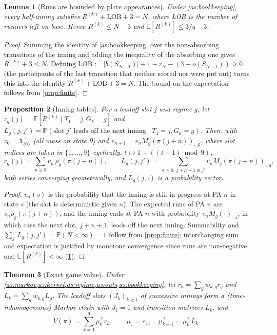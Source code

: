 \documentclass[11pt]{article}
\newtheorem{theorem}{Theorem}
\newtheorem{proposition}[theorem]{Proposition}
\newtheorem{lemma}[theorem]{Lemma}
\theoremstyle{definition}
\theoremstyle{remark}
\newcommand{\E}{\mathbb{E}}
\renewcommand{\P}{\mathbb{P}}
\newcommand{\cS}{\mathcal{S}}
\newcommand{\abs}{\mathsf{a}}
\begin{document}
\begin{lemma}[Runs are bounded by plate appearances]\label{lem:runs}
Under \cref{as:bookkeeping}, every half-inning satisfies $R^{(k)}+\mathrm{LOB}+3=N$, where LOB is
the number of runners left on base. Hence $R^{(k)}\le N-3$ and $\E[R^{(k)}]\le 3/q-3$.
\end{lemma}

\begin{proof}
Summing the identity of \cref{as:bookkeeping} over the non-absorbing transitions of the inning and
adding the inequality of the absorbing one gives $R^{(k)}+3\le N$. Defining
$\mathrm{LOB}:=|b(S_{N-1})|+1-r_N-(3-o(S_{N-1}))\ge0$ (the participants of the last transition
that neither scored nor were put out) turns this into the identity $R^{(k)}+\mathrm{LOB}+3=N$.
The bound on the expectation follows from \cref{prop:finite}.
\end{proof}

\begin{proposition}[Inning tables]\label{prop:tables}
For a leadoff slot $j$ and regime $g$, let $r_g(j)=\E[R^{(k)}\mid T_1=j,G_k=g]$ and
$L_g(j,j')=\P(\text{slot }j'\text{ leads off the next inning}\mid T_1=j,G_k=g)$. Then, with
$v_0=\mathbf{1}_{\{0\}}^\top$ (all mass on state 0) and $v_{n+1}=v_n M_g(\pi(j+n))_{\cdot,\cS}$,
where slot indices are taken in $\{1,\dots,9\}$ cyclically, $t\mapsto1+((t-1)\bmod 9)$,
\[
r_g(j)=\sum_{n\ge0}v_n\,\rho_g(\pi(j+n)),\qquad
L_g(j,j')=\sum_{n\ge0:\ j+n+1\equiv j'}v_n M_g(\pi(j+n))_{\cdot,\abs},
\]
both series converging geometrically, and $L_g(j,\cdot)$ is a probability vector.
\end{proposition}

\begin{proof}
$v_n(s)$ is the probability that the inning is still in progress at PA $n$ in state $s$ (the slot is
deterministic given $n$). The expected runs of PA $n$ are $v_n\rho_g(\pi(j+n))$, and the inning
ends at PA $n$ with probability $v_nM_g(\cdot)_{\cdot,\abs}$, in which case the next slot,
$j+n+1$, leads off the next inning. Summability and $\sum_{j'}L_g(j,j')=\P(N<\infty)=1$ follow from
\cref{prop:finite}; interchanging sum and expectation is justified by monotone convergence since
runs are non-negative and $\E[R^{(k)}]<\infty$ (\cref{lem:runs}).
\end{proof}

\begin{theorem}[Exact game value]\label{thm:value}
Under \cref{as:markov,as:kernel,as:regime,as:outs,as:bookkeeping}, let
$r_k=\sum_g w_{k,g}r_g$ and $L_k=\sum_g w_{k,g}L_g$. The leadoff slots $(J_k)_{k\ge1}$ of successive
innings form a (time-inhomogeneous) Markov chain with $J_1=1$ and transition matrices $L_k$, and
\begin{equation}\label{eq:value}
V(\pi)=\sum_{k=1}^{9}\mu_k^\top r_k,\qquad \mu_1=e_1,\quad \mu_{k+1}^\top=\mu_k^\top L_k .
\end{equation}
\end{theorem}
\end{document}
